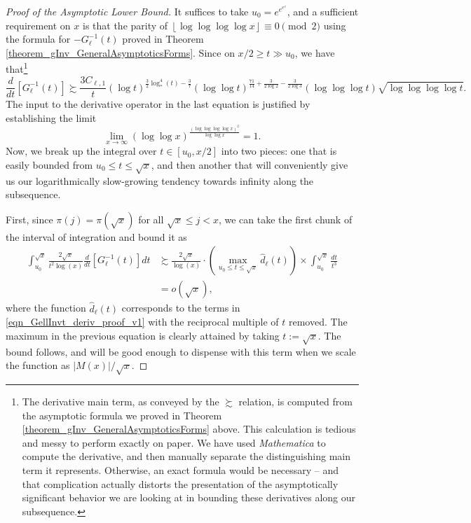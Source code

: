 \documentclass[11pt,reqno,a4letter]{article}
\numberwithin{figure}{section}
\numberwithin{table}{section}
\newcommand{\floor}[1]{\left\lfloor #1 \right\rfloor}
\theoremstyle{plain}
\numberwithin{theorem}{section}
\theoremstyle{definition}
\begin{document}
\begin{proof}[Proof of the Asymptotic Lower Bound] 
It suffices to take $u_0 = e^{e^{e^{e}}}$, 
and a sufficient requirement on $x$ is that the parity of 
$\floor{\log\log\log\log x} \equiv 0 \pmod{2}$ using the formula for 
$-G_{\ell}^{-1}(t)$ proved in Theorem \ref{theorem_gInv_GeneralAsymptoticsForms}. 
Since on $x/2 \geq t \gg u_0$, we have that\footnote{ 
     The derivative main term, as conveyed by the $\succsim$ relation, is computed from 
     the asymptotic formula we proved in Theorem \ref{theorem_gInv_GeneralAsymptoticsForms} above. 
     This calculation is tedious and messy to perform exactly on paper. We have used 
     \emph{Mathematica} to compute the derivative, and then manually separate the distinguishing 
     main term it represents. Otherwise, an exact formula would be necessary -- and that complication 
     actually distorts the presentation of the asymptotically significant behavior we are looking 
     at in bounding these derivatives along our subsequence. 
}
\begin{equation} 
\label{eqn_GellInvt_deriv_proof_v1} 
\frac{d}{dt}\left[G_{\ell}^{-1}(t)\right] \succsim 
     \frac{3 C_{\ell,1}}{t} (\log t)^{\frac{3}{2} \log_{\ast}^4(t) - \frac{3}{7}} 
     (\log\log t)^{\frac{71}{14} + \frac{3}{2 \log 2} - \frac{3}{2 \log 3}} 
     (\log\log\log t) \sqrt{\log\log\log\log t}. 
\end{equation} 
The input to the derivative operator in the last equation is justified by establishing the limit 
\[
\lim_{x \rightarrow \infty} (\log\log x)^{\frac{(\log\log\log\log x)^2}{\log\log x}} = 1. 
\]
Now, we break up the integral over $t \in [u_0, x/2]$ into two pieces: one that is easily bounded 
from $u_0 \leq t \leq \sqrt{x}$, 
and then another that will conveniently give us our logarithmically slow-growing tendency towards 
infinity along the subsequence. 

First, since $\pi(j) = \pi(\sqrt{x})$ for all $\sqrt{x} \leq j < x$, we can take the first chunk 
of the interval of integration and bound it as 
\begin{align*} 
\int_{u_0}^{\sqrt{x}} \frac{2\sqrt{x}}{t^2 \log(x)} \frac{d}{dt}\left[G_{\ell}^{-1}(t)\right] dt & \succsim 
     \frac{2\sqrt{x}}{\log(x)} \cdot \left(\max\limits_{u_0 \leq t \leq \sqrt{x}} 
     \widehat{d}_{\ell}(t)\right) \times \int_{u_0}^{\sqrt{x}} \frac{dt}{t^3} \\ 
     & = o(\sqrt{x}), 
\end{align*} 
where the function $\widehat{d}_{\ell}(t)$ corresponds to the terms in 
\eqref{eqn_GellInvt_deriv_proof_v1} with the reciprocal multiple of $t$ removed. 
The maximum in the previous equation is clearly attained by taking $t := \sqrt{x}$. 
The bound follows, and will be good enough to dispense with this term when we scale the function as 
$|M(x)| / \sqrt{x}$. 


\end{proof}
\end{document}

